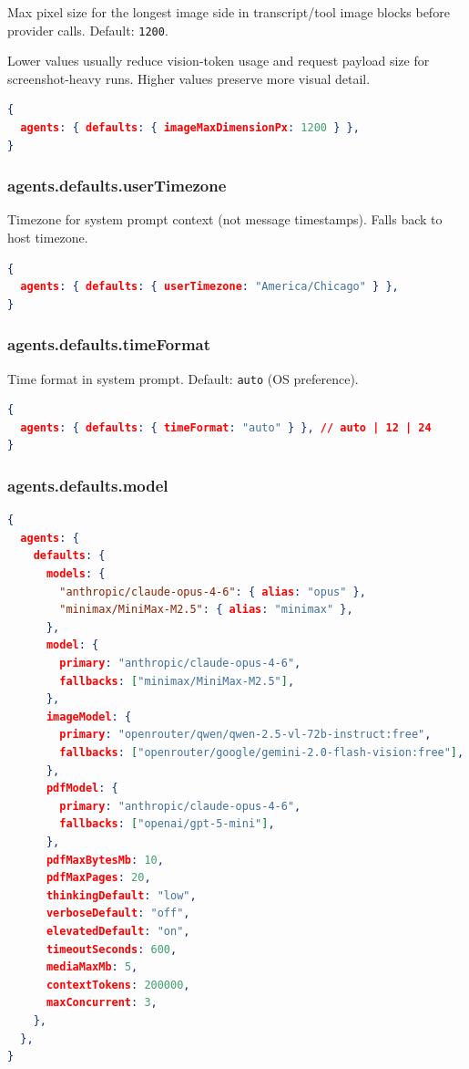 Max pixel size for the longest image side in transcript/tool image blocks before provider calls.
Default: \texttt{1200}.

Lower values usually reduce vision-token usage and request payload size for screenshot-heavy runs.
Higher values preserve more visual detail.

\begin{lstlisting}[language=json]
{
  agents: { defaults: { imageMaxDimensionPx: 1200 } },
}
\end{lstlisting}


\subsubsection{agents.defaults.userTimezone}


Timezone for system prompt context (not message timestamps). Falls back to host timezone.

\begin{lstlisting}[language=json]
{
  agents: { defaults: { userTimezone: "America/Chicago" } },
}
\end{lstlisting}


\subsubsection{agents.defaults.timeFormat}


Time format in system prompt. Default: \texttt{auto} (OS preference).

\begin{lstlisting}[language=json]
{
  agents: { defaults: { timeFormat: "auto" } }, // auto | 12 | 24
}
\end{lstlisting}


\subsubsection{agents.defaults.model}


\begin{lstlisting}[language=json]
{
  agents: {
    defaults: {
      models: {
        "anthropic/claude-opus-4-6": { alias: "opus" },
        "minimax/MiniMax-M2.5": { alias: "minimax" },
      },
      model: {
        primary: "anthropic/claude-opus-4-6",
        fallbacks: ["minimax/MiniMax-M2.5"],
      },
      imageModel: {
        primary: "openrouter/qwen/qwen-2.5-vl-72b-instruct:free",
        fallbacks: ["openrouter/google/gemini-2.0-flash-vision:free"],
      },
      pdfModel: {
        primary: "anthropic/claude-opus-4-6",
        fallbacks: ["openai/gpt-5-mini"],
      },
      pdfMaxBytesMb: 10,
      pdfMaxPages: 20,
      thinkingDefault: "low",
      verboseDefault: "off",
      elevatedDefault: "on",
      timeoutSeconds: 600,
      mediaMaxMb: 5,
      contextTokens: 200000,
      maxConcurrent: 3,
    },
  },
}
\end{lstlisting}


